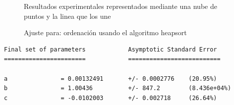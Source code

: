 
\begin{figure}[H]%
    \centering
    \caption{Resultados experimentales representados mediante una nube de puntos y la linea que los une}%
    \centering
    \caption{Ajuste para: ordenación usando el algoritmo heapsort}%
\end{figure}

\begin{verbatim}
Final set of parameters            Asymptotic Standard Error
=======================            ==========================

a               = 0.00132491       +/- 0.0002776    (20.95%)
b               = 1.00436          +/- 847.2        (8.436e+04%)
c               = -0.0102003       +/- 0.002718     (26.64%)


\end{verbatim}
